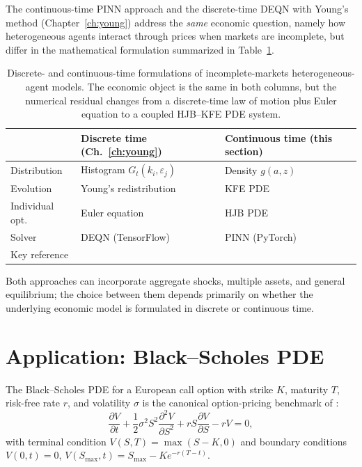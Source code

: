 \documentclass[11pt,a4paper]{report}
\begin{document}
The continuous-time PINN approach and the discrete-time DEQN with Young's method (Chapter~\ref{ch:young}) address the \emph{same} economic question, namely how heterogeneous agents interact through prices when markets are incomplete, but differ in the mathematical formulation summarized in Table~\ref{tab:discrete_continuous_ha}.

\begin{table}[ht]
\centering
\small
\begin{tabular}{lll}
\toprule
& \textbf{Discrete time (Ch.~\ref{ch:young})} & \textbf{Continuous time (this section)} \\
\midrule
Distribution & Histogram $G_t(k_i, \varepsilon_j)$ & Density $g(a,z)$ \\
Evolution & Young's redistribution & KFE PDE \\
Individual opt. & Euler equation & HJB PDE \\
Solver & DEQN (TensorFlow) & PINN (PyTorch) \\
Key reference & \citet{krusell1998income} & \citet{achdou2022income} \\
\bottomrule
\end{tabular}
\caption{Discrete- and continuous-time formulations of incomplete-markets heterogeneous-agent models.  The economic object is the same in both columns, but the numerical residual changes from a discrete-time law of motion plus Euler equation to a coupled HJB--KFE PDE system.}
\label{tab:discrete_continuous_ha}
\end{table}

Both approaches can incorporate aggregate shocks, multiple assets, and general equilibrium; the choice between them depends primarily on whether the underlying economic model is formulated in discrete or continuous time.

\section{Application: Black--Scholes PDE}
\label{sec:bs_pinn}

The Black--Scholes PDE for a European call option with strike $K$, maturity $T$, risk-free rate $r$, and volatility $\sigma$ is the canonical option-pricing benchmark of \citet{black1973pricing}:
\begin{equation}
\frac{\partial V}{\partial t} + \frac{1}{2}\sigma^2 S^2 \frac{\partial^2 V}{\partial S^2} + rS\frac{\partial V}{\partial S} - rV = 0,
\end{equation}
with terminal condition $V(S,T) = \max(S-K, 0)$ and boundary conditions $V(0,t)=0$, $V(S_\mathrm{max}, t) = S_\mathrm{max} - Ke^{-r(T-t)}$.
\end{document}
